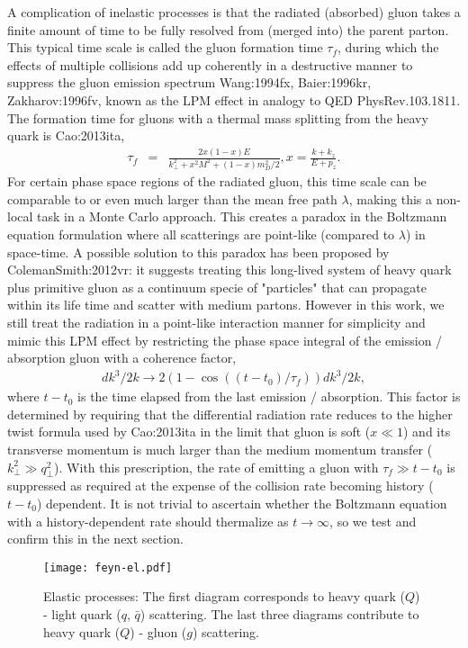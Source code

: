 A complication of inelastic processes is that the radiated (absorbed) gluon takes a finite amount of time to be fully resolved from (merged into) the parent parton.
This typical time scale is called the gluon formation time $\tau_f$, during which the effects of multiple collisions add up coherently in a destructive manner to suppress the gluon emission spectrum {Wang:1994fx, Baier:1996kr, Zakharov:1996fv}, known as the LPM effect in analogy to QED {PhysRev.103.1811}.
The formation time for gluons with a thermal mass splitting from the heavy quark is {Cao:2013ita},
\begin{eqnarray}
\tau_f &=& \frac{2x(1-x)E}{k_\perp^2 + x^2M^2 + (1-x)m_D^2/2}, x = \frac{k+k_z}{E+p_z}.
\end{eqnarray}
For certain phase space regions of the radiated gluon, this time scale can be comparable to or even much larger than the mean free path $\lambda$, making this a non-local task in a Monte Carlo approach.
This creates a paradox in the Boltzmann equation formulation where all scatterings are point-like (compared to $\lambda$) in space-time.
A possible solution to this paradox has been proposed by {ColemanSmith:2012vr}: it suggests treating this long-lived system of heavy quark plus primitive gluon as a continuum specie of "particles" that can propagate within its life time and scatter with medium partons.
However in this work, we still treat the radiation in a point-like interaction manner for simplicity and mimic this LPM effect by restricting the phase space integral of the emission / absorption gluon with a coherence factor,
\begin{eqnarray}\label{eq:LPM}
dk^3/2k \rightarrow 2\left(1 - \cos\left((t-t_0)/\tau_f\right) \right)dk^3/2k,
\end{eqnarray}
where $t-t_0$ is the time elapsed from the last emission / absorption.
This factor is determined by requiring that the differential radiation rate reduces to the higher twist formula used by {Cao:2013ita} in the limit that gluon is soft ($x\ll 1$) and its transverse momentum is much larger than the medium momentum transfer ($k_\perp^2 \gg q_\perp^2$).
With this prescription, the rate of emitting a gluon with $\tau_f \gg t-t_0$ is suppressed as required at the expense of the collision rate becoming history ($t-t_0$) dependent.
It is not trivial to ascertain whether the Boltzmann equation with a history-dependent rate should thermalize as $t\rightarrow \infty$, so we test and confirm this in the next section.

\begin{figure}
\texttt{[image: feyn-el.pdf]}
\caption{Elastic processes: The first diagram corresponds to heavy quark ($Q$) - light quark ($q$, $\bar{q}$) scattering. The last three diagrams contribute to heavy quark ($Q$) - gluon ($g$) scattering.}\label{plots:feyn-elastic}
\end{figure}

